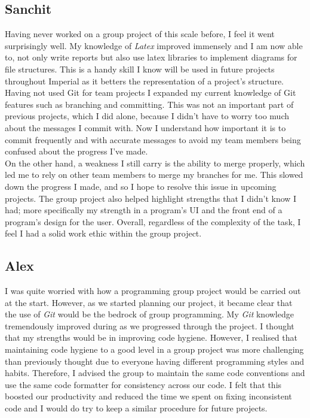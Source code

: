 \documentclass[10pt]{article}
\begin{document}
\subsection*{Sanchit}

Having never worked on a group project of this scale before, I feel it went surprisingly well. My knowledge of {\sl Latex} improved immensely and I am now able to, not only write reports but also use latex libraries to implement diagrams for file structures. This is a handy skill I know will be used in future projects throughout Imperial as it betters the representation of a project’s structure. Having not used Git for team projects I expanded my current knowledge of Git features such as branching and committing. This was not an important part of previous projects, which I did alone, because I didn’t have to worry too much about the messages I commit with. Now I understand how important it is to commit frequently and with accurate messages to avoid my team members being confused about the progress I’ve made. 
\\

On the other hand, a weakness I still carry is the ability to merge properly, which led me to rely on other team members to merge my branches for me. This slowed down the progress I made, and so I hope to resolve this issue in upcoming projects. The group project also helped highlight strengths that I didn’t know I had; more specifically my strength in a program’s UI and the front end of a program’s design for the user. Overall, regardless of the complexity of the task, I feel I had a solid work ethic within the group project.


\subsection*{Alex}

I was quite worried with how a programming group project would be carried out at the start. However, as we started planning our project, it became clear that the use of {\sl Git} would be the bedrock of group programming. My {\sl Git} knowledge tremendously improved during as we progressed through the project. I thought that my strengths would be in improving code hygiene. However, I realised that maintaining code hygiene to a good level in a group project was more challenging than previously thought due to everyone having different programming styles and habits. Therefore, I advised the group to maintain the same code conventions and use the same code formatter for consistency across our code. I felt that this boosted our productivity and reduced the time we spent on fixing inconsistent code and I would do try to keep a similar procedure for future projects.
\end{document}
